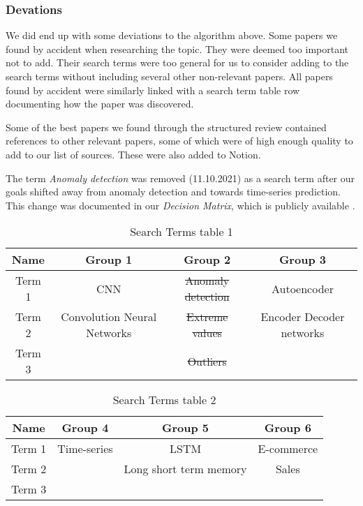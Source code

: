 \subsubsection{Devations}
We did end up with some deviations to the algorithm above.
Some papers we found by accident when researching the topic.
They were deemed too important not to add.
Their search terms were too general for us to consider adding to the search terms without including several other non-relevant papers.
All papers found by accident were similarly linked with a search term table row documenting
how the paper was discovered.

Some of the best papers we found through the structured review contained references to other relevant papers,
some of which were of high enough quality to add to our list of sources.
These were also added to Notion.

The term \textit{Anomaly detection} was removed (11.10.2021) as a search term after our goals shifted away from anomaly detection and towards time-series prediction.
This change was documented in our \textit{Decision Matrix}, which is publicly available
\cite{decisionmatrix}.

\begin{table}[h]
  \centering
  \begin{tabular}{|c|c|c|c|}\hline
    Name   & Group 1                     & Group 2                  & Group 3                  \\ \hline
    Term 1 & CNN                         & \sout{Anomaly detection} & Autoencoder              \\ \hline
    Term 2 & Convolution Neural Networks & \sout{Extreme values}    & Encoder Decoder networks \\ \hline
    Term 3 &                             & \sout{Outliers}          &                          \\ \hline
  \end{tabular}
  \caption{Search Terms table 1}
  \label{tab:search-terms-table-1}
\end{table}%

\begin{table}[h]
  \begin{center}
    \begin{tabular}{|c|c|c|c|}\hline
      Name   & Group 4     & Group 5                & Group 6    \\ \hline
      Term 1 & Time-series & LSTM                   & E-commerce \\ \hline
      Term 2 &             & Long short term memory & Sales      \\ \hline
      Term 3 &             &                        &            \\ \hline
    \end{tabular}
    \caption{Search Terms table 2}
    \label{tab:search-terms-table-2}
  \end{center}
\end{table}%

